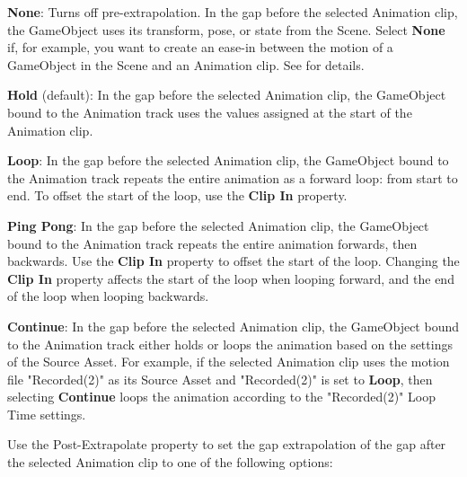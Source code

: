 \begin{DoxyItemize}
\item {\bfseries{None}}\+: Turns off pre-\/extrapolation. In the gap before the selected Animation clip, the Game\+Object uses its transform, pose, or state from the Scene. Select {\bfseries{None}} if, for example, you want to create an ease-\/in between the motion of a Game\+Object in the Scene and an Animation clip. See  for details.
\item {\bfseries{Hold}} (default)\+: In the gap before the selected Animation clip, the Game\+Object bound to the Animation track uses the values assigned at the start of the Animation clip.
\item {\bfseries{Loop}}\+: In the gap before the selected Animation clip, the Game\+Object bound to the Animation track repeats the entire animation as a forward loop\+: from start to end. To offset the start of the loop, use the {\bfseries{Clip In}} property.
\item {\bfseries{Ping Pong}}\+: In the gap before the selected Animation clip, the Game\+Object bound to the Animation track repeats the entire animation forwards, then backwards. Use the {\bfseries{Clip In}} property to offset the start of the loop. Changing the {\bfseries{Clip In}} property affects the start of the loop when looping forward, and the end of the loop when looping backwards.
\item {\bfseries{Continue}}\+: In the gap before the selected Animation clip, the Game\+Object bound to the Animation track either holds or loops the animation based on the settings of the Source Asset. For example, if the selected Animation clip uses the motion file "{}\+Recorded(2)"{} as its Source Asset and "{}\+Recorded(2)"{} is set to {\bfseries{Loop}}, then selecting {\bfseries{Continue}} loops the animation according to the "{}\+Recorded(2)"{} Loop Time settings.
\end{DoxyItemize}

Use the Post-\/\+Extrapolate property to set the gap extrapolation of the gap after the selected Animation clip to one of the following options\+:


